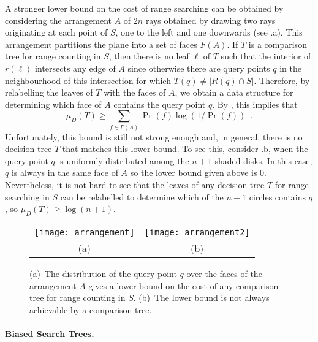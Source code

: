 \documentclass[charterfonts]{patmorin}
\begin{document}
A stronger lower bound on the cost of range searching can be obtained
by considering the arrangement $A$ of $2n$ rays obtained by drawing
two rays originating at each point of $S$, one to the left and one
downwards (see .a).  This arrangement partitions
the plane into a set of faces $F(A)$.  If $T$ is a comparison tree for
range counting in $S$, then there is no leaf $\ell$ of $T$ such that
the interior of $r(\ell)$ intersects any edge of $A$ since otherwise
there are query points $q$ in the neighbourhood of this intersection
for which $T(q)\neq |R(q)\cap S|$.  Therefore, by relabelling the leaves
of $T$ with the faces of $A$, we obtain a data structure for
determining which face of $A$ contains the query point $q$.
By , this implies that
\[
   \mu_D(T) \ge \sum_{f\in F(A)} \Pr(f)\log(1/\Pr(f)) \enspace .
\]
Unfortunately, this bound is still not strong enough and, in general,
there is no decision tree $T$ that matches this lower bound.  To see
this, consider .b, when the query point $q$ is
uniformly distributed among the $n+1$ shaded disks.  In this case,
$q$ is always in the same face of $A$ so the lower bound given above
is 0.  Nevertheless, it is not hard to see that the leaves of
any decision tree $T$ for range searching in $S$ can be relabelled to
determine which of the $n+1$ circles contains $q$, so $\mu_D(T) \ge
\log(n+1)$.

\begin{figure}
  \begin{center}
    \begin{tabular}{cc}
      \texttt{[image: arrangement]} &
      \texttt{[image: arrangement2]} \\
        (a) & (b)
    \end{tabular}
  \end{center}
  \caption{(a)~The distribution of the query point $q$ over the faces
     of the arrangement $A$ gives a lower bound on the cost of any
     comparison tree for range counting in $S$. (b)~The lower bound is
     not always achievable by a comparison tree.}
\end{figure}

\paragraph{Biased Search Trees.}
\end{document}
